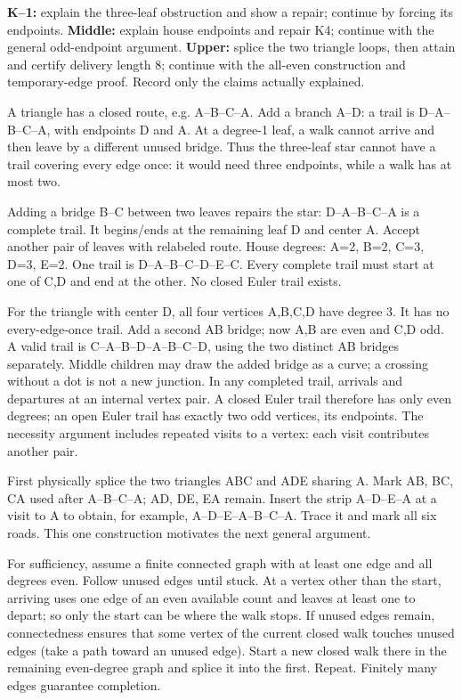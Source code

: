 \documentclass[11pt]{article}
\begin{document}
\textbf{K--1:} explain the three-leaf obstruction and show a repair; continue by forcing its endpoints. \textbf{Middle:} explain house endpoints and repair K4; continue with the general odd-endpoint argument. \textbf{Upper:} splice the two triangle loops, then attain and certify delivery length 8; continue with the all-even construction and temporary-edge proof. Record only the claims actually explained.

\newpage

A triangle has a closed route, e.g. A--B--C--A. Add a branch A--D: a trail is D--A--B--C--A, with endpoints D and A. At a degree-1 leaf, a walk cannot arrive and then leave by a different unused bridge. Thus the three-leaf star cannot have a trail covering every edge once: it would need three endpoints, while a walk has at most two.

Adding a bridge B--C between two leaves repairs the star: D--A--B--C--A is a complete trail. It begins/ends at the remaining leaf D and center A. Accept another pair of leaves with relabeled route.
House degrees: A=2, B=2, C=3, D=3, E=2. One trail is D--A--B--C--D--E--C. Every complete trail must start at one of C,D and end at the other. No closed Euler trail exists.

For the triangle with center D, all four vertices A,B,C,D have degree 3. It has no every-edge-once trail. Add a second AB bridge; now A,B are even and C,D odd. A valid trail is C--A--B--D--A--B--C--D, using the two distinct AB bridges separately. Middle children may draw the added bridge as a curve; a crossing without a dot is not a new junction.
In any completed trail, arrivals and departures at an internal vertex pair. A closed Euler trail therefore has only even degrees; an open Euler trail has exactly two odd vertices, its endpoints. The necessity argument includes repeated visits to a vertex: each visit contributes another pair.

First physically splice the two triangles ABC and ADE sharing A. Mark AB, BC, CA used after A--B--C--A; AD, DE, EA remain. Insert the strip A--D--E--A at a visit to A to obtain, for example, A--D--E--A--B--C--A. Trace it and mark all six roads. This one construction motivates the next general argument.

For sufficiency, assume a finite connected graph with at least one edge and all degrees even. Follow unused edges until stuck. At a vertex other than the start, arriving uses one edge of an even available count and leaves at least one to depart; so only the start can be where the walk stops. If unused edges remain, connectedness ensures that some vertex of the current closed walk touches unused edges (take a path toward an unused edge). Start a new closed walk there in the remaining even-degree graph and splice it into the first. Repeat. Finitely many edges guarantee completion.
\end{document}
